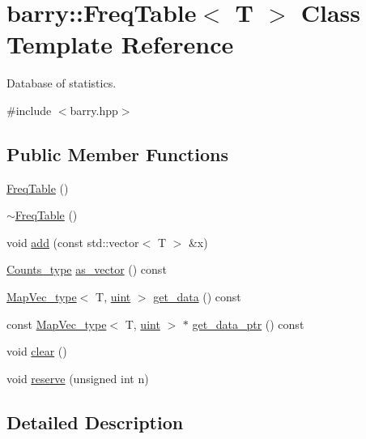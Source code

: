 \hypertarget{classbarry_1_1_freq_table}{}\section{barry\+:\+:Freq\+Table$<$ T $>$ Class Template Reference}
\label{classbarry_1_1_freq_table}


Database of statistics.  




{\ttfamily \#include $<$barry.\+hpp$>$}

\subsection*{Public Member Functions}
\begin{DoxyCompactItemize}
\item 
\hyperlink{classbarry_1_1_freq_table_aea4b22f8097950c3d78e81ab2ed38ae1}{Freq\+Table} ()
\item 
\hyperlink{classbarry_1_1_freq_table_a420a7e4e6740ed7f2b0db1a238f53713}{$\sim$\+Freq\+Table} ()
\item 
void \hyperlink{classbarry_1_1_freq_table_a919e08556ba3aa9535a64827315bb89a}{add} (const std\+::vector$<$ T $>$ \&x)
\item 
\hyperlink{namespacebarry_a3e2d8c3b6cf602107559d4237d9f1315}{Counts\+\_\+type} \hyperlink{classbarry_1_1_freq_table_a1898e62605d8753e170189936d403e05}{as\+\_\+vector} () const
\item 
\hyperlink{namespacebarry_a2f0d3aab1d67e4c8eaeab9022e16139f}{Map\+Vec\+\_\+type}$<$ T, \hyperlink{namespacebarry_a11dfc53ddb4672278319aa04f1e09a6c}{uint} $>$ \hyperlink{classbarry_1_1_freq_table_a7b99496d1c2f4193654752856b30d1a5}{get\+\_\+data} () const
\item 
const \hyperlink{namespacebarry_a2f0d3aab1d67e4c8eaeab9022e16139f}{Map\+Vec\+\_\+type}$<$ T, \hyperlink{namespacebarry_a11dfc53ddb4672278319aa04f1e09a6c}{uint} $>$ $\ast$ \hyperlink{classbarry_1_1_freq_table_ab5dd6677f52072c93d18b2b9a3369ae7}{get\+\_\+data\+\_\+ptr} () const
\item 
void \hyperlink{classbarry_1_1_freq_table_a326660096e4309780aea8355d0f74ac7}{clear} ()
\item 
void \hyperlink{classbarry_1_1_freq_table_a0bdced25f7c0bee38e073c4654578d19}{reserve} (unsigned int n)
\end{DoxyCompactItemize}


\subsection{Detailed Description}
